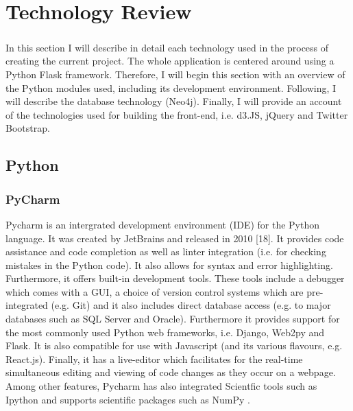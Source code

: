 \chapter{Technology Review}
\paragraph{}
In this section I will describe in detail each technology used in the process of creating the current project. The whole application is centered around using a Python Flask framework. Therefore, I will begin this section with an overview of the Python modules used, including its development environment. Following, I will describe the database technology (Neo4j). Finally, I will provide an account of the technologies used for building the front-end, i.e. d3.JS, jQuery and Twitter Bootstrap.

\section{Python}
\subsection{PyCharm}
Pycharm is an intergrated development environment (IDE) for the Python language. It was created by JetBrains and released in 2010 [18]. It provides code assistance and code completion as well as linter integration (i.e. for checking mistakes in the Python code). It also allows for syntax and error highlighting. Furthermore, it offers built-in development tools. These tools include a debugger which comes with a GUI, a choice of version control systems which are pre-integrated (e.g. Git) and it also includes direct database access (e.g. to major databases such as SQL Server and Oracle). Furthermore it provides support for the most commonly used Python web frameworks, i.e.  Django, Web2py and Flask. It is also compatible for use with Javascript (and its various flavours, e.g. React.js). Finally, it has a live-editor which facilitates for the real-time simultaneous editing and viewing of code changes as they occur on a webpage. Among other features, Pycharm has also integrated Scientfic tools such as Ipython and supports scientific packages such as NumPy \cite{pycharm}.
